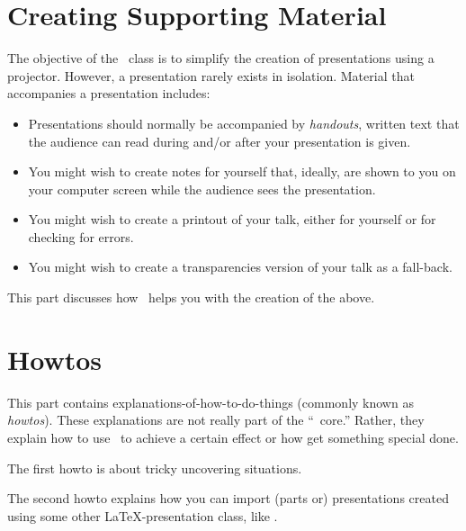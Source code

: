 \documentclass{ltxdoc}
\begin{document}
\part{Creating Supporting Material}

The objective of the \beamer\ class is to simplify the creation of presentations using a projector. However, a presentation rarely exists in isolation. Material that accompanies a presentation includes:
\begin{itemize}
\item
  Presentations should normally be accompanied by \emph{handouts}, written text that the audience can read during and/or after your presentation is given.
\item
  You might wish to create notes for yourself that, ideally, are shown to you on your computer screen while the audience sees the presentation.
\item
  You might wish to create a printout of your talk, either for yourself or for checking for errors.
\item
  You might wish to create a transparencies version of your talk as a fall-back.
\end{itemize}

This part discusses how \beamer\ helps you with the creation of the above.








\part{Howtos}

This part contains explanations-of-how-to-do-things (commonly known as \emph{howtos}). These explanations are not really part of the ``\beamer\ core.'' Rather, they explain how to use \beamer\ to achieve a certain effect or how get something special done.

The first howto is about tricky uncovering situations.

The second howto explains how you can import (parts or) presentations created using some other \LaTeX-presentation class, like \prosper.




\printindex
\end{document}
